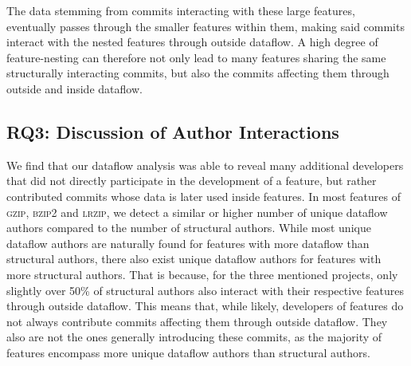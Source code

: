 The data stemming from commits interacting with these large features, eventually passes through the smaller features within them, making said commits interact with the nested features through outside dataflow.
A high degree of feature-nesting can therefore not only lead to many features sharing the same structurally interacting commits, but also the commits affecting them through outside and inside dataflow.

\subsection*{\textbf{RQ3: Discussion of Author Interactions}}\label{sec:disc_author_interactions}

We find that our dataflow analysis was able to reveal many additional developers that did not directly participate in the development of a feature, but rather contributed commits whose data is later used inside features.
In most features of \textsc{gzip}, \textsc{bzip2} and \textsc{lrzip}, we detect a similar or higher number of unique dataflow authors compared to the number of structural authors.
While most unique dataflow authors are naturally found for features with more dataflow than structural authors, there also exist unique dataflow authors for features with more structural authors.
That is because, for the three mentioned projects, only slightly over 50\% of structural authors also interact with their respective features through outside dataflow.
This means that, while likely, developers of features do not always contribute commits affecting them through outside dataflow.
They also are not the ones generally introducing these commits, as the majority of features encompass more unique dataflow authors than structural authors.

